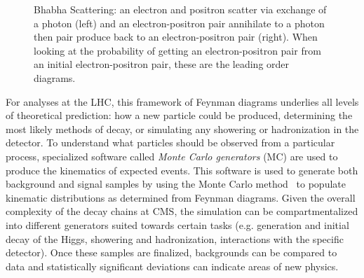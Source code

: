\begin{figure}
\begin{center}
\unitlength=1mm
\end{center}
\caption[Feynman Diagrams of Bhabha Scattering]{Bhabha Scattering: an electron and positron scatter via exchange of a photon (left) and an electron-positron pair annihilate to a photon then pair produce back to an electron-positron pair (right). When looking at the probability of getting an electron-positron pair from an initial electron-positron pair, these are the leading order diagrams.}
\label{fig:Bhabha}
\end{figure}

For analyses at the LHC, this framework of Feynman diagrams underlies all levels of theoretical prediction: how a new particle could be produced, determining the most likely methods of decay, or simulating any showering or hadronization in the detector. To understand what particles should be observed from a particular process, specialized software called \textit{Monte Carlo generators} (MC) are used to produce the kinematics of expected events. This software is used to generate both background and signal samples by using the Monte Carlo method~\cite{} to populate kinematic distributions as determined from Feynman diagrams. Given the overall complexity of the decay chains at CMS, the simulation can be compartmentalized into different generators suited towards certain tasks (e.g. generation and initial decay of the Higgs, showering and hadronization, interactions with the specific detector). Once these samples are finalized, backgrounds can be compared to data and statistically significant deviations can indicate areas of new physics.

